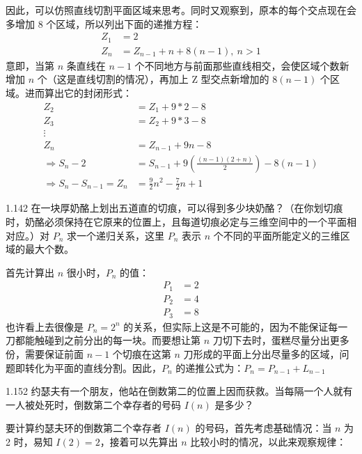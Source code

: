 因此，可以仿照直线切割平面区域来思考。同时又观察到，原本的每个交点现在会多增加 8 个区域，所以列出下面的递推方程：
\begin{align*}
  Z_1 &= 2 \\
  Z_n &= Z_{n-1} + n + 8(n-1), \ n>1
\end{align*}
意即，当第 \( n \) 条直线在 \( n-1 \) 个不同地方与前面那些直线相交，会使区域个数新增加 \( n \) 个（这是直线切割的情况），再加上 Z 型交点新增加的 \( 8(n-1) \) 个区域。进而算出它的封闭形式：
\begin{align*}
  Z_2 &= Z_1 + 9*2 - 8 \\
  Z_3 &= Z_2 + 9*3 - 8 \\
  \vdots \\
  Z_n &= Z_{n-1} + 9n - 8 \\
  \Rightarrow S_n - 2 &= S_{n-1} + 9(\frac{(n-1)(2+n)}{2}) - 8(n-1) \\
  \Rightarrow S_n - S_{n-1} = Z_n &= \frac{9}{2} n^2 - \frac{7}{2} n + 1
\end{align*}

\begin{problem}{1.14}{2}
  在一块厚奶酪上划出五道直的切痕，可以得到多少块奶酪？（在你划切痕时，奶酪必须保持在它原来的位置上，且每道切痕必定与三维空间中的一个平面相对应。）对 \( P_n \) 求一个递归关系，这里 \( P_n \) 表示 \( n \) 个不同的平面所能定义的三维区域的最大个数。
\end{problem}

首先计算出 \( n \) 很小时，\( P_n \) 的值：
\begin{align*}
  P_1 &= 2 \\
  P_2 &= 4 \\
  P_3 &= 8
\end{align*}
也许看上去很像是 \( P_n = 2^n \) 的关系，但实际上这是不可能的，因为不能保证每一刀都能触碰到之前分出的每一块。而要想让第 \( n \) 刀切下去时，蛋糕尽量分出更多份，需要保证前面 \( n-1 \) 个切痕在这第 \( n \) 刀形成的平面上分出尽量多的区域，问题即转化为平面的直线分割。因此，\( P_n \) 的递推公式为：\( P_n = P_{n-1} + L_{n-1} \)

\begin{problem}{1.15}{2}
  约瑟夫有一个朋友，他站在倒数第二的位置上因而获救。当每隔一个人就有一人被处死时，倒数第二个幸存者的号码 \( I(n) \) 是多少？
\end{problem}

要计算约瑟夫环的倒数第二个幸存者 \( I(n) \) 的号码，首先考虑基础情况：当 \( n \) 为 2 时，易知 \( I(2) = 2 \)，接着可以先算出 \( n \) 比较小时的情况，以此来观察规律：


